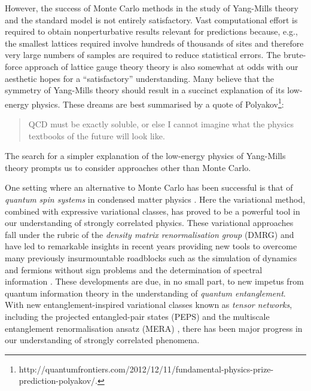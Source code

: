 \documentclass[12pt]{amsart}
\theoremstyle{definition}
\theoremstyle{remark}
\numberwithin{equation}{section}
\begin{document}
However, the success of Monte Carlo methods in the study of Yang-Mills theory and the standard model is not entirely satisfactory. Vast computational effort is required to obtain nonperturbative results relevant for predictions because, e.g., the smallest lattices required involve hundreds of thousands of sites and therefore very large numbers of samples are required to reduce statistical errors. The brute-force approach of lattice gauge theory theory is also somewhat at odds with our aesthetic hopes for a ``satisfactory'' understanding. Many believe that the  symmetry of Yang-Mills theory should result in a succinct explanation of its low-energy physics. These dreams are best summarised by a quote of Polyakov\footnote{http://quantumfrontiers.com/2012/12/11/fundamental-physics-prize-prediction-polyakov/.}: \begin{quote} QCD must be exactly soluble, or else I cannot imagine what the physics textbooks of the future will look like. \end{quote} The search for a simpler explanation of the low-energy physics of Yang-Mills theory prompts us to consider approaches other than Monte Carlo.

One setting where an alternative to Monte Carlo has been successful is that of \emph{quantum spin systems} in condensed matter physics \cites{auerbach:1994a, sachdev:2011a}. Here the variational method, combined with expressive variational classes, has proved to be a powerful tool in our understanding of strongly correlated physics. These variational approaches fall under the rubric of the \emph{density matrix renormalisation group} (DMRG) \cites{schollwoeck:2005a,schollwock:2011a} and have led to remarkable insights in recent years providing new tools to overcome many previously insurmountable roadblocks such as the simulation of dynamics \cites{vidal:2003a, haegeman:2011b} and fermions \cites{corboz:2009a, corboz:2010a, corboz:2010b, kraus:2010a} without sign problems and the determination of spectral information \cite{haegeman:2012a}. These developments are due, in no small part, to new impetus from quantum information theory in the understanding of \emph{quantum entanglement}. With new entanglement-inspired variational classes known as \emph{tensor networks}, including the projected entangled-pair states (PEPS) \cite{verstraete:2004a} and the multiscale entanglement renormalisation ansatz (MERA) \cites{vidal:2006a, vidal:2007a}, there has been major progress in our understanding of strongly correlated phenomena.
\end{document}
